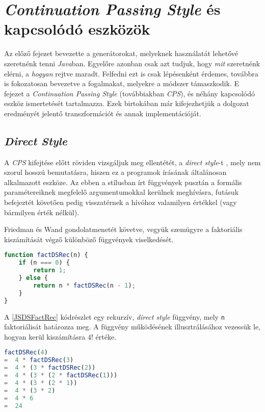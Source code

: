 \chapter{\textit{Continuation Passing Style} és kapcsolódó eszközök}

Az előző fejezet bevezette a generátorokat, melyeknek használatát lehetővé szeretnénk tenni \textit{Java}ban. Egyelőre azonban csak azt tudjuk, hogy \textit{mit} szeretnénk elérni, a \textit{hogyan} rejtve maradt. Felfedni ezt is csak lépésenként érdemes, továbbra is fokozatosan bevezetve a fogalmakat, melyekre a módszer támaszkodik. E fejezet a \textit{Continuation Passing Style} (továbbiakban \textit{CPS}), és néhány kapcsolódó eszköz ismertetését tartalmazza. Ezek birtokában már kifejezhetjük a dolgozat eredményét jelentő transzformációt és annak implementációját.

\section{\textit{Direct Style}}

A \textit{CPS} kifejtése előtt röviden vizsgáljuk meg ellentétét, a \textit{direct style}-t \cite{Danvy1994}, mely nem szorul hosszú bemutatásra, hiszen ez a programok írásának általánosan alkalmazott eszköze. Az ebben a stílusban írt függvények pusztán a formális paramétereiknek megfelelő argumentumokkal kerülnek meghívásra, futásuk befejeztét követően pedig visszatérnek a hívóhoz valamilyen értékkel (vagy bármilyen érték nélkül).

Friedman és Wand \citeyear{EssProgLan} gondolatmenetét követve, vegyük szemügyre a faktoriális kiszámítását végző különböző függvények viselkedését.

\begin{lstlisting}[language=JavaScript, caption={\textit{Direct style} faktoriálist meghatározó rekurzív függvény JavaScriptben}, captionpos=b, label=JSDSFactRec]
function factDSRec(n) {
    if (n === 0) {
        return 1;
    } else {
        return n * factDSRec(n - 1);
    }
}
\end{lstlisting}

A \ref{JSDSFactRec} kódrészlet egy rekurzív, \textit{direct style} függvény, mely \texttt{n} faktoriálisát határozza meg. A függvény működésének illusztrálásához vezessük le, hogyan kerül kiszámításra $4!$ értéke.

\begin{lstlisting}[language=JavaScript, caption={$4!$ kiszámítása \texttt{factDSRec} segítségével}, captionpos=b, numbers=none]
   factDSRec(4)
=  4 * factDSRec(3)
=  4 * (3 * factDSRec(2))
=  4 * (3 * (2 * factDSRec(1)))
=  4 * (3 * (2 * 1))
=  4 * (3 * 2)
=  4 * 6
=  24
\end{lstlisting}

